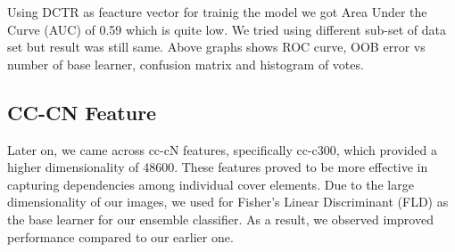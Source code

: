 \begin{flushleft}
Using DCTR as feacture vector for trainig the model we got Area Under the Curve (AUC) of 0.59 which is quite low. We tried using different sub-set of data set but result was still same. Above graphs shows ROC curve, OOB error vs number of base learner, confusion matrix and histogram of votes.
\end{flushleft}
\clearpage
\subsection{CC-CN Feature}
Later on, we came across cc-cN features, specifically cc-c300, which provided a higher dimensionality of 48600. These features proved to be more effective in capturing dependencies among individual cover elements. Due to the large dimensionality of our images, we used for Fisher's Linear Discriminant (FLD) as the base learner for our ensemble classifier. As a result, we observed improved performance compared to our earlier one.\\
